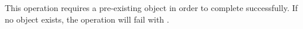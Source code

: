 This operation requires a pre-existing object in order to complete successfully.
If no object exists, the operation will fail with .
